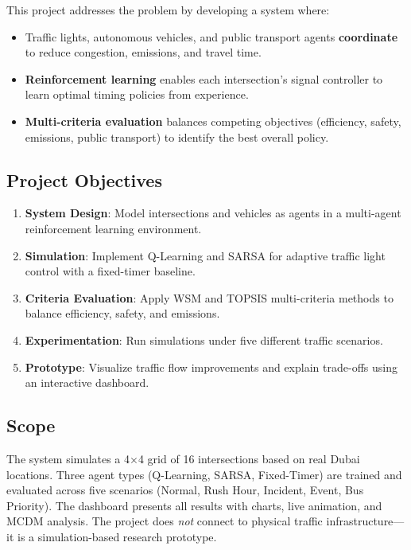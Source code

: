 \documentclass[12pt, a4paper]{article}
\begin{document}
This project addresses the problem by developing a system where:
\begin{itemize}[nosep]
    \item Traffic lights, autonomous vehicles, and public transport agents \textbf{coordinate} to reduce congestion, emissions, and travel time.
    \item \textbf{Reinforcement learning} enables each intersection's signal controller to learn optimal timing policies from experience.
    \item \textbf{Multi-criteria evaluation} balances competing objectives (efficiency, safety, emissions, public transport) to identify the best overall policy.
\end{itemize}

\subsection{Project Objectives}

\begin{enumerate}[nosep]
    \item \textbf{System Design}: Model intersections and vehicles as agents in a multi-agent reinforcement learning environment.
    \item \textbf{Simulation}: Implement Q-Learning and SARSA for adaptive traffic light control with a fixed-timer baseline.
    \item \textbf{Criteria Evaluation}: Apply WSM and TOPSIS multi-criteria methods to balance efficiency, safety, and emissions.
    \item \textbf{Experimentation}: Run simulations under five different traffic scenarios.
    \item \textbf{Prototype}: Visualize traffic flow improvements and explain trade-offs using an interactive dashboard.
\end{enumerate}

\subsection{Scope}

The system simulates a 4$\times$4 grid of 16 intersections based on real Dubai locations. Three agent types (Q-Learning, SARSA, Fixed-Timer) are trained and evaluated across five scenarios (Normal, Rush Hour, Incident, Event, Bus Priority). The dashboard presents all results with charts, live animation, and MCDM analysis. The project does \textit{not} connect to physical traffic infrastructure---it is a simulation-based research prototype.
\end{document}
